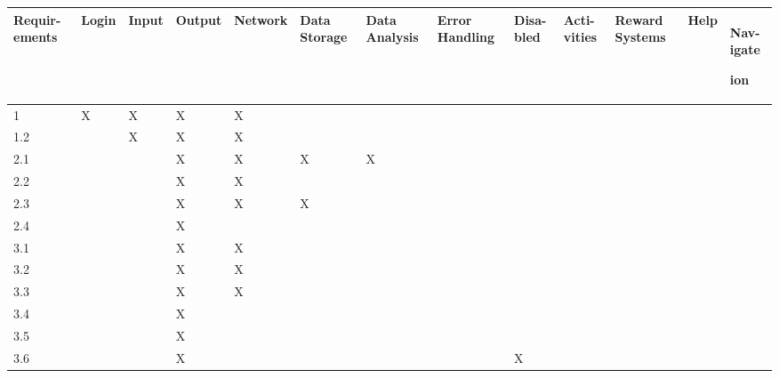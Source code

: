 \documentclass[11pt]{article}
\begin{document}
 \begin{tabular}{ |p{0.2cm}|p{0.1cm}|p{0.5cm}|p{0.1cm}|p{0.1cm}|p{0.1cm}|p{0.1cm}|p{0.1cm}|p{0.1cm}|p{0.1cm}|p{0.1cm}|p{0.1cm}|p{0.1cm}|  }
 \hline

 Requir-ements & Login & Input & Output & Network & Data Storage & Data Analysis &Error Handling &Disa-bled &Acti-vities &Reward Systems & Help & Nav-igate

 ion\\

 \hline

 1& X & X  & X  & X  &   &   &   &   &   &   &   &\\

 \hline

 1.2&  &X   &X   & X  &   &   &   &   &   &   &   &\\

 \hline

 2.1&  &   &  X & X  &  X &  X &   &   &   &   &   &\\

 \hline

 2.2&  &   & X  & X  &   &   &   &   &   &   &   &\\

 \hline

 2.3&  &   & X  & X  &  X &   &   &   &   &   &   &\\

 \hline

 2.4&  &   & X  &   &   &   &   &   &   &   &   &\\

 \hline

 3.1&  &   & X  & X  &   &   &   &   &   &   &   &\\

 \hline

 3.2&  &   & X  & X  &  &   &   &   &   &   &   &\\

 \hline

 3.3&  &   & X  & X  &  &   &   &   &   &   &   &\\

 \hline

 3.4&  &   & X  &   &   &   &   &   &   &   &   &\\

 \hline

 3.5&  &   &  X &   &   &   &   &   &   &   &   &\\

 \hline

 3.6&  &   &  X &   &   &   &   & X  &   &   &   &\\


\end{tabular}
\end{document}

